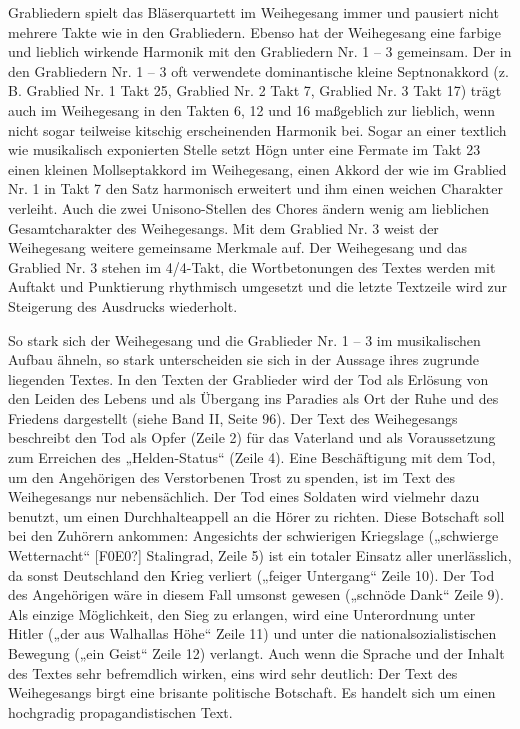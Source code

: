 \documentclass[a4paper]{article}
\begin{document}
Grabliedern spielt das Bläserquartett im Weihegesang immer und pausiert
nicht mehrere Takte wie in den Grabliedern. \newline
Ebenso hat der Weihegesang eine farbige und lieblich wirkende Harmonik
mit den Grabliedern Nr. 1 – 3 gemeinsam. Der in den Grabliedern Nr. 1 –
3 oft verwendete dominantische kleine Septnonakkord (z. B. Grablied Nr.
1 Takt 25, Grablied Nr. 2 Takt 7, Grablied Nr. 3 Takt 17) trägt auch im
Weihegesang in den Takten 6, 12 und 16 maßgeblich zur lieblich, wenn
nicht sogar teilweise kitschig erscheinenden Harmonik bei. Sogar an
einer textlich wie musikalisch exponierten Stelle setzt Högn unter eine
Fermate im Takt 23 einen kleinen Mollseptakkord im Weihegesang, einen
Akkord der wie im Grablied Nr. 1 in Takt 7 den Satz harmonisch
erweitert und ihm einen weichen Charakter verleiht. Auch die zwei
Unisono-Stellen des Chores ändern wenig am lieblichen Gesamtcharakter
des Weihegesangs. Mit dem Grablied Nr. 3 weist der Weihegesang weitere
gemeinsame Merkmale auf. Der Weihegesang und das Grablied Nr. 3 stehen
im 4/4-Takt, die Wortbetonungen des Textes werden mit Auftakt und
Punktierung rhythmisch umgesetzt und die letzte Textzeile wird zur
Steigerung des Ausdrucks wiederholt.

So stark sich der Weihegesang und die Grablieder Nr. 1 – 3 im
musikalischen Aufbau ähneln, so stark unterscheiden sie sich in der
Aussage ihres zugrunde liegenden Textes. In den Texten der Grablieder
wird der Tod als Erlösung von den Leiden des Lebens und als Übergang
ins Paradies als Ort der Ruhe und des Friedens dargestellt (siehe Band
II, Seite 96). Der Text des Weihegesangs beschreibt den Tod als Opfer
(Zeile 2) für das Vaterland und als Voraussetzung zum Erreichen des
„Helden-Status“ (Zeile 4). Eine Beschäftigung mit dem Tod, um den
Angehörigen des Verstorbenen Trost zu spenden, ist im Text des
Weihegesangs nur nebensächlich. Der Tod eines Soldaten wird vielmehr
dazu benutzt, um einen Durchhalteappell an die Hörer zu richten. Diese
Botschaft soll bei den Zuhörern ankommen: Angesichts der schwierigen
Kriegslage („schwierge Wetternacht“ [F0E0?] Stalingrad, Zeile 5) ist
ein totaler Einsatz aller unerlässlich, da sonst Deutschland den Krieg
verliert („feiger Untergang“ Zeile 10). Der Tod des Angehörigen wäre in
diesem Fall umsonst gewesen („schnöde Dank“ Zeile 9). Als einzige
Möglichkeit, den Sieg zu erlangen, wird eine Unterordnung unter Hitler
(„der aus Walhallas Höhe“ Zeile 11) und unter die
nationalsozialistischen Bewegung („ein Geist“ Zeile 12) verlangt. Auch
wenn die Sprache und der Inhalt des Textes sehr befremdlich wirken,
eins wird sehr deutlich: Der Text des Weihegesangs birgt eine brisante
politische Botschaft. Es handelt sich um einen hochgradig
propagandistischen Text.
\end{document}
